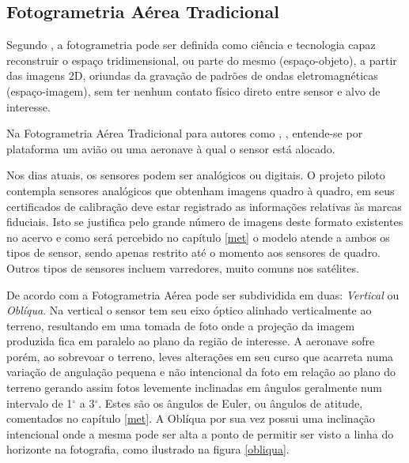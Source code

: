 \subsection{Fotogrametria Aérea Tradicional}\label{foto_trad}
Segundo \cite[p. 16]{coelho2007fotogrametria}, a fotogrametria pode ser definida como ciência e tecnologia capaz reconstruir o espaço tridimensional, ou parte do mesmo (espaço-objeto), a partir das imagens 2D, oriundas da gravação de padrões de ondas eletromagnéticas (espaço-imagem), sem ter nenhum contato físico direto entre sensor e alvo de interesse.

Na Fotogrametria Aérea Tradicional para autores como , , entende-se por plataforma um avião ou uma aeronave à qual o sensor está alocado.

Nos dias atuais, os sensores podem ser analógicos ou digitais. O projeto piloto contempla sensores analógicos que obtenham imagens quadro à quadro, em seus certificados de calibração deve estar registrado as informações relativas às marcas fiduciais. Isto se justifica pelo grande número de imagens deste formato existentes no acervo e como será percebido no capítulo \ref{met} o modelo atende a ambos os tipos de sensor, sendo apenas restrito até o momento aos sensores de quadro. Outros tipos de sensores incluem varredores, muito comuns nos satélites.

De acordo com  a Fotogrametria Aérea pode ser subdividida em duas: \textit{Vertical} ou \textit{Oblíqua}. Na vertical o sensor tem seu eixo óptico alinhado verticalmente ao terreno, resultando em uma tomada de foto onde a projeção da imagem produzida fica em paralelo ao plano da região de interesse. A aeronave sofre porém, ao sobrevoar o terreno, leves alterações em seu curso que acarreta numa variação de angulação pequena e não intencional da foto em relação ao plano do terreno gerando assim fotos levemente inclinadas em ângulos geralmente num intervalo de 1$^{\circ}$ a 3$^{\circ}$. Estes são os ângulos de Euler, ou ângulos de atitude, comentados no capítulo \ref{met}. A Oblíqua por sua vez possui uma inclinação intencional onde a mesma pode ser alta a ponto de permitir ser visto a linha do horizonte na fotografia, como ilustrado na figura \ref{obliqua}.

